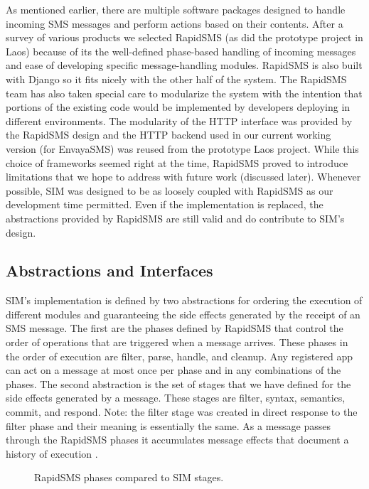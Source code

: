 \documentclass{acm_proc_article-sp}
\begin{document}
As mentioned earlier, there are multiple software packages designed to handle incoming SMS messages and perform actions based on their contents. After a survey of various products we selected RapidSMS (as did the prototype project in Laos) because of its the well-defined phase-based handling of incoming messages and ease of developing specific message-handling modules. RapidSMS is also built with Django so it fits nicely with the other half of the system. The RapidSMS team has also taken special care to modularize the system with the intention that portions of the existing code would be implemented by developers deploying in different environments. The modularity of the HTTP interface was provided by the RapidSMS design and the HTTP backend used in our current working version (for EnvayaSMS) was reused from the prototype Laos project. While this choice of frameworks seemed right at the time, RapidSMS proved to introduce limitations that we hope to address with future work (discussed later). Whenever possible, SIM was designed to be as loosely coupled with RapidSMS as our development time permitted. Even if the implementation is replaced, the abstractions provided by RapidSMS are still valid and do contribute to SIM's design.

\subsection{Abstractions and Interfaces}

SIM's implementation is defined by two abstractions for ordering the execution of different modules and guaranteeing the side effects generated by the receipt of an SMS message. The first are the phases defined by RapidSMS that control the order of operations that are triggered when a message arrives. These phases in the order of execution are filter, parse, handle, and cleanup. Any registered app can act on a message at most once per phase and in any combinations of the phases. The second abstraction is the set of stages that we have defined for the side effects generated by a message. These stages are filter, syntax, semantics, commit, and respond. Note: the filter stage was created in direct response to the filter phase and their meaning is essentially the same. As a message passes through the RapidSMS phases it accumulates message effects that document a history of execution \cite{rapidsms:routers}. 

\begin{figure*}
\centering
{}
\caption{RapidSMS phases compared to SIM stages.}
\end{figure*}
\end{document}
